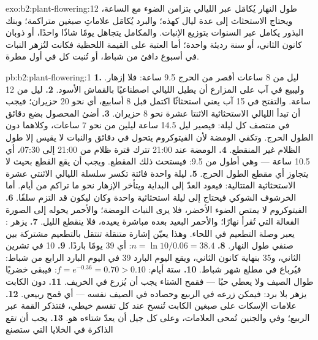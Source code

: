 \begin{solution}{exo:b2:plant-flowering:12}
طول النهار يُكامَل عبر الليالي بتزامن الضوء
مع الساعة، ويحتاج الاستحثاث إلى عدة ليال كهذه؛ والبرد
يُكامَل علاماتِ صبغين متراكمة؛ وبنك البذور
يكامل عبر السنوات بتوزيع الإنبات. والمكامل
يتجاهل يومًا شاذًا واحدًا، أو ذوبان كانون الثاني، أو سنة رديئة واحدة؛
أما العتبة على القيمة اللحظية فكانت لتُزهر النبات في
أسبوع دافئ من شباط، أو تُنبت كل  في أول مطرة.
\end{solution}

\begin{solution}{pb:b2:plant-flowering:1}
\textbf{1.} ليل من 8 ساعات أقصر من الحرج 9.5 ساعة:
فلا إزهار. وليبيع في آب على المزارع أن يطيل الليالي
اصطناعيًا بالقماش الأسود.
\textbf{2.} ليل من 12 ساعة. والتفتح في 15 آب يعني استحثاثًا
اكتمل قبل 8 أسابيع، أي نحو 20 حزيران؛
فيجب أن تبدأ الليالي الاستحثاثية الاثنتا عشرة نحو 8 حزيران.
\textbf{3.} أضئ المحصول بضع دقائق في منتصف كل
ليلة: فيصير ليل 14.5 ساعة ليلين من نحو 7 ساعات، وكلاهما دون
الطول الحرج. وتكفي الومضة لأن الفيتوكروم
يتحول في دقائق والنبات لا يقيس إلا طول
الظلام غير المنقطع.
\textbf{4.} الومضة عند 21:00 تترك فترة ظلام من
21:00 إلى 07:30، أي 10.5 ساعة --- وهي أطول من 9.5:
فيستحث ذلك المقطع. ويجب أن يقع القطع بحيث لا يتجاوز أي مقطع
الطول الحرج.
\textbf{5.} ليلة واحدة فائتة تكسر سلسلة الليالي الاثنتي عشرة
الاستحثاثية المتتالية: فيعود العدّ إلى البداية ويتأخر الإزهار
نحو ما تراكم من أيام. أما الخرشوف الشوكي فيحتاج إلى
ليلة استحثاثية واحدة وكان ليكون قد التزم سلفًا.
\textbf{6.} الفيتوكروم لا يمتص الضوء الأخضر، فلا يرى النبات
الومضة؛ والأحمر يحوله إلى الصورة الفعالة التي
تُقرأ نهارًا؛ والأحمر البعيد بعده مباشرة يعيده، فلا
ينقطع الليل.
\textbf{7.} يزهر :  يعبر وصلة
التطعيم في اللحاء. وهذا يعيّن إشارة متنقلة تنتقل بالتطعيم
مشتركة بين صنفي طول النهار.
\textbf{8.} $n = \ln 10/0.06 = 38.4$: أي 39 يومًا باردًا.
\textbf{9.} 10 في تشرين الثاني، و35 بنهاية كانون الثاني، ويقع اليوم البارد
39 في اليوم البارد الرابع من شباط: فيُرباع في
مطلع شهر شباط.
\textbf{10.} ستة أيام: $f = e^{-0.36} = 0.70 > 0.10$: فيبقى
خضريًا طوال الصيف ولا يعطي حبًا --- فقمح الشتاء يجب أن
يُزرع في الخريف.
\textbf{11.} دون الكابت يزهر بلا برد: فيمكن
زرعه في الربيع وحصاده في الصيف نفسه --- أي قمح ربيعي.
\textbf{12.} علامات الإسكات على صبغين الكابت
تُنسخ عند كل تقسم خيطي، فتتذكر القمة عبر الربيع؛ وفي
 والجنين تُمحى العلامات، وعلى كل جيل
أن يعدّ شتاءه هو.
\textbf{13.} يجب أن تقع الذاكرة في الخلايا التي ستصنع

\end{solution}
